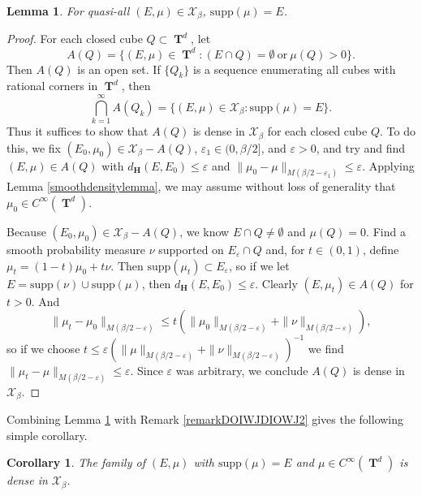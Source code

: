 \documentclass[dvipsnames,letterpaper,12pt]{article}
\numberwithin{equation}{section}
\DeclareMathOperator{\TT}{\mathbf{T}}
\newtheorem{lemma}[theorem]{Lemma}
\newtheorem{corollary}[theorem]{Corollary}
\numberwithin{theorem}{section}
\begin{document}
\begin{lemma} \label{lemmaOIJAWDIOJW23232}
    For quasi-all $(E,\mu) \in \mathcal{X}_\beta$, $\text{supp}(\mu) = E$.
\end{lemma}
\begin{proof}
    For each closed cube $Q \subset \TT^d$, let
    \[ A(Q) = \{ (E,\mu) \in \TT^d: (E \cap Q) = \emptyset\ \text{or}\ \mu(Q) > 0 \}. \]
    Then $A(Q)$ is an open set. If $\{ Q_k \}$ is a sequence enumerating all cubes with rational corners in $\TT^d$, then
    \begin{equation}
        \bigcap_{k = 1}^\infty A(Q_k) = \{ (E,\mu) \in \mathcal{X}_\beta : \text{supp}(\mu) = E \}.
    \end{equation}
    Thus it suffices to show that $A(Q)$ is dense in $\mathcal{X}_\beta$ for each closed cube $Q$. To do this, we fix $(E_0,\mu_0) \in \mathcal{X}_\beta - A(Q)$, $\varepsilon_1 \in (0,\beta/2]$, and $\varepsilon > 0$, and try and find $(E,\mu) \in A(Q)$ with $d_\mathbf{H}(E,E_0) \leq \varepsilon$ and $\| \mu_0 - \mu \|_{M(\beta/2 - \varepsilon_1)} \leq \varepsilon$. Applying Lemma \ref{smoothdensitylemma}, we may assume without loss of generality that $\mu_0 \in C^\infty(\TT^d)$.

    Because $(E_0,\mu_0) \in \mathcal{X}_\beta - A(Q)$, we know $E \cap Q \neq \emptyset$ and $\mu(Q) = 0$. Find a smooth probability measure $\nu$ supported on $E_\varepsilon \cap Q$ and, for $t \in (0,1)$, define $\mu_t = (1 - t) \mu_0 + t \nu$. Then $\text{supp}(\mu_t) \subset E_\varepsilon$, so if we let $E = \text{supp}(\nu) \cup \text{supp}(\mu)$, then $d_\mathbf{H}(E,E_0) \leq \varepsilon$. Clearly $(E,\mu_t) \in A(Q)$ for $t > 0$. And
    \begin{equation}
        \| \mu_t - \mu_0 \|_{M(\beta/2 - \varepsilon)} \leq t \left( \| \mu_0 \|_{M(\beta/2 - \varepsilon)} + \| \nu \|_{M(\beta/2 - \varepsilon)} \right),
    \end{equation}
    so if we choose $t \leq \varepsilon (\| \mu \|_{M(\beta/2 - \varepsilon)} + \| \nu \|_{M(\beta/2 - \varepsilon)})^{-1}$ we find $\| \mu_t - \mu \|_{M(\beta/2 - \varepsilon)} \leq \varepsilon$. Since $\varepsilon$ was arbitrary, we conclude $A(Q)$ is dense in $\mathcal{X}_\beta$.
\end{proof}

Combining Lemma \ref{lemmaOIJAWDIOJW23232} with Remark \ref{remarkDOIWJDIOWJ2} gives the following simple corollary.

\begin{corollary} \label{corollaryOIDJOWIJD2212}
    The family of $(E,\mu)$ with $\text{supp}(\mu) = E$ and $\mu \in C^\infty(\TT^d)$ is dense in $\mathcal{X}_\beta$.
\end{corollary}
\end{document}
